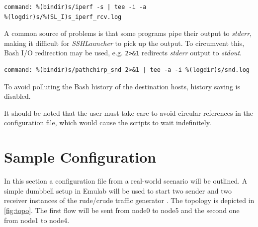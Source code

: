 \begin{Verbatim}
command: %(bindir)s/iperf -s | tee -i -a
%(logdir)s/%(SL_I)s_iperf_rcv.log  
\end{Verbatim}

A common source of problems is that some programs pipe their output to
\emph{stderr}, making it difficult for \emph{SSHLauncher} to pick up
the output. To circumvent this, Bash I/O redirection may be used,
e.g. \Verb=2>&1= redirects \emph{stderr} output to \emph{stdout}.

\begin{Verbatim}
command: %(bindir)s/pathchirp_snd 2>&1 | tee -a -i %(logdir)s/snd.log
\end{Verbatim}

To avoid polluting the Bash history of the destination hosts, history
saving is disabled.

It should be noted that the user must take care to avoid circular
references in the configuration file, which would cause the scripts to
wait indefinitely.


\chapter{Sample Configuration}
\label{sec:example}
In this section a configuration file from a real-world scenario will
be outlined. A simple dumbbell setup in Emulab will be used to start
two sender and two receiver instances of the rude/crude traffic
generator \cite{rude}. The topology is depicted in \ref{fig:topo}. The
first flow will be sent from node0 to node5 and the second one from
node1 to node4.

